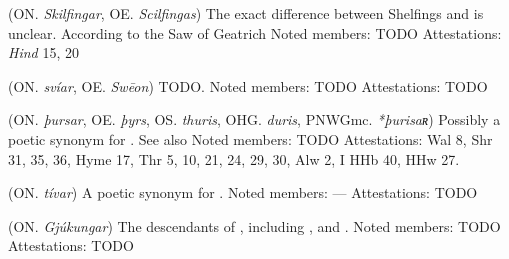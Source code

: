 \begin{itemize}
 (ON. \emph{Skilfingar}, OE. \emph{Scilfingas})
  The exact difference between Shelfings and  is unclear. According to the Saw of Geatrich
  Noted members: TODO
  Attestations: \emph{Hind} 15, 20

 (ON. \emph{svíar}, OE. \emph{Swēon})
  TODO.
  Noted members: TODO
  Attestations: TODO

 (ON. \emph{þursar}, OE. \emph{þyrs}, OS. \emph{thuris}, OHG. \emph{duris}, PNWGmc. \emph{*þurisaʀ})
  Possibly a poetic synonym for . See also 
  Noted members: TODO
  Attestations: Wal 8, Shr 31, 35, 36, Hyme 17, Thr 5, 10, 21, 24, 29, 30, Alw 2, I HHb 40, HHw 27.

 (ON. \emph{tívar})
  A poetic synonym for .
  Noted members: —
  Attestations: TODO

 (ON. \emph{Gjúkungar})
  The descendants of , including ,  and .
  Noted members: TODO
  Attestations: TODO

\end{itemize}

